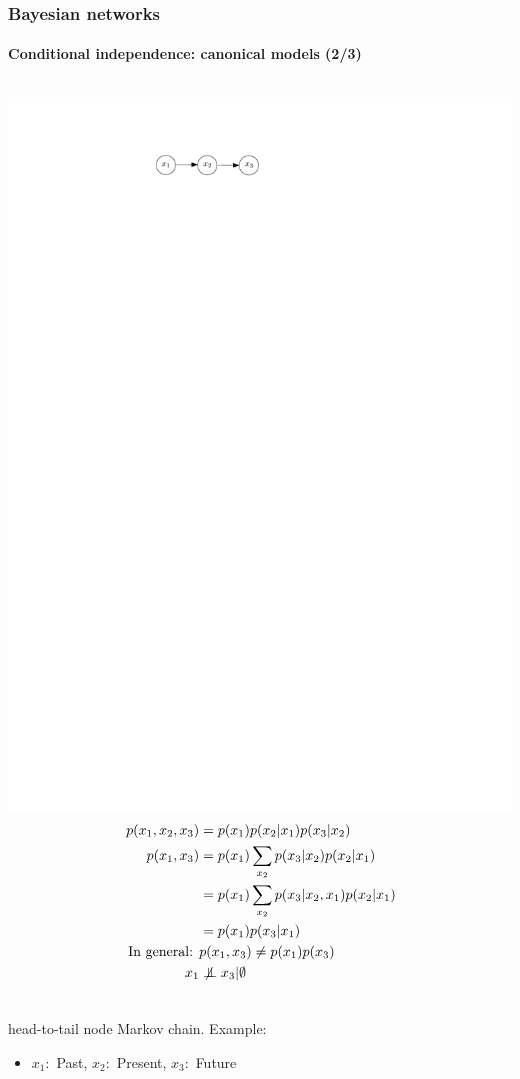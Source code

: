 \documentclass[slidestop,compress,mathserif]{beamer}
\newcommand{\bi}{\begin{itemize}}
\newcommand{\ei}{\end{itemize}}
\newcommand{\notindep}{\ensuremath{\perp\mkern -10mu \perp \mkern -17mu \not \mkern 17mu}} %
\begin{document}
\begin{frame}
	\frametitle{Bayesian networks}
	\framesubtitle{Conditional independence: canonical models (2/3)}
  \begin{columns}
    \includegraphics[width=.8\textwidth]{tailtohead}%
   \begin{align*}
   p(x_1,x_2,x_3) & = p(x_1)p(x_2|x_1)p(x_3|x_2)\\
   p(x_1,x_3) & =p(x_1)\sum_{x_2}p(x_3|x_2)p(x_2|x_1)\\
   &= p(x_1)\sum_{x_2}p(x_3|x_2,x_1)p(x_2|x_1)\\
                &=  p(x_1)p(x_3|x_1)\\
 \text{  In general:  }  & p(x_1,x_3) \neq p(x_1)p(x_3)\\
   x_1        & \notindep x_3|\emptyset
   \end{align*}
   \end{columns} 
    \begin{block}{head-to-tail node}
    Markov chain. Example:
    \bi
    \item
     $x_1: $ Past, $x_2 :$ Present, $x_3 :$ Future
    \ei
    \end{block}

\end{frame}
\end{document}
